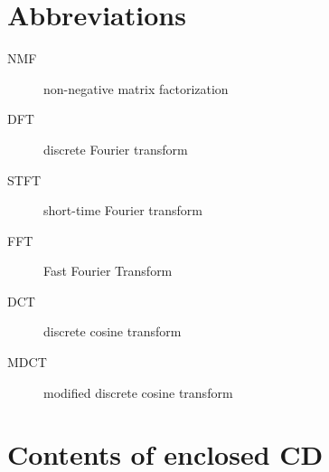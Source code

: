 \documentclass[thesis=M,english,hidelinks]{FITthesis}[2018/03/12]
\begin{document}
\chapter{Abbreviations}
\begin{description}
	\item[NMF] non-negative matrix factorization
	\item[DFT] discrete Fourier transform
	\item[STFT] short-time Fourier transform
	\item[FFT] Fast Fourier Transform
	\item[DCT] discrete cosine transform
	\item[MDCT] modified discrete cosine transform
\end{description}


\chapter{Contents of enclosed CD}

\begin{figure}
\end{figure}
\end{document}
